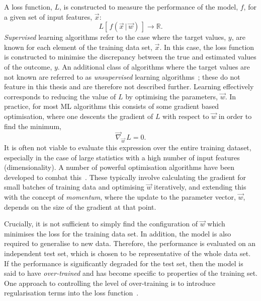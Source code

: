 A loss function, $L$, is constructed to measure the performance of the model, $f$, for a given set of input features, $\vec{x}$:
\begin{equation}
    L[\,f(\vec{x}\,|\,\vec{w})\,] \rightarrow \mathbb{R}.
\end{equation}
\noindent
\textit{Supervised} learning algorithms refer to the case where the target values, $y$, are known for each element of the training data set, $\vec{x}$. In this case, the loss function is constructed to minimise the discrepancy between the true and estimated values of the outcome, $y$. An additional class of algorithms where the target values are not known are referred to as \textit{unsupervised} learning algorithms~\cite{10.5555/3086952}; these do not feature in this thesis and are therefore not described further. Learning effectively corresponds to reducing the value of $L$ by optimising the parameters, $\vec{w}$. In practice, for most ML algorithms this consists of some gradient based optimisation, where one descents the gradient of $L$ with respect to $\vec{w}$ in order to find the minimum,
\begin{equation}\label{eq:loss_minimum}
    \vec{\nabla}_{\vec{w}}\,L = 0.
\end{equation}
\noindent
It is often not viable to evaluate this expression over the entire training dataset, especially in the case of large statistics with a high number of input features (dimensionality). A number of powerful optimisation algorithms have been developed to combat this~\cite{10.5555/3086952,pmlr-v28-sutskever13,kingma2017adam}. These typically involve calculating the gradient for small batches of training data and optimising $\vec{w}$ iteratively, and extending this with the concept of \textit{momentum}, where the update to the parameter vector, $\vec{w}$, depends on the size of the gradient at that point.

Crucially, it is not sufficient to simply find the configuration of $\vec{w}$ which minimises the loss for the training data set. In addition, the model is also required to generalise to new data. Therefore, the performance is evaluated on an independent test set, which is chosen to be representative of the whole data set. If the performance is significantly degraded for the test set, then the model is said to have \textit{over-trained} and has become specific to properties of the training set. One approach to controlling the level of over-training is to introduce regularisation terms into the loss function~\cite{10.5555/3086952}.

